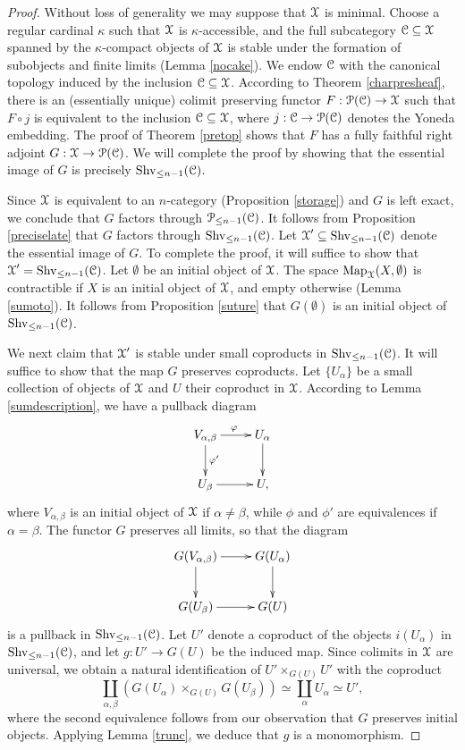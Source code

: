 \begin{proof}
Without loss of generality we may suppose that $\operatorname{\mathcal{X}}$ is minimal. Choose a regular cardinal $\kappa$ such that $\operatorname{\mathcal{X}}$ is $\kappa$-accessible, and the full subcategory $\operatorname{\mathcal{C}} \subseteq \operatorname{\mathcal{X}}$ spanned by the $\kappa$-compact objects of $\operatorname{\mathcal{X}}$ is stable under the formation of subobjects and finite limits (Lemma \ref{nocake}).
We endow $\operatorname{\mathcal{C}}$ with the canonical topology induced by the inclusion
$\operatorname{\mathcal{C}} \subseteq \operatorname{\mathcal{X}}$. According to Theorem \ref{charpresheaf}, there is an (essentially unique) colimit preserving functor $F: \operatorname{\mathcal{P}}(\operatorname{\mathcal{C}}) \rightarrow \operatorname{\mathcal{X}}$ such that $F \circ j$ is equivalent
to the inclusion $\operatorname{\mathcal{C}} \subseteq \operatorname{\mathcal{X}}$, where $j: \operatorname{\mathcal{C}} \rightarrow \operatorname{\mathcal{P}}(\operatorname{\mathcal{C}})$ denotes the Yoneda embedding. The proof of Theorem \ref{pretop} shows that $F$ has a fully faithful right adjoint $G: \operatorname{\mathcal{X}} \rightarrow \operatorname{\mathcal{P}}(\operatorname{\mathcal{C}})$. We will complete the proof by showing that the essential image of $G$ is precisely $\operatorname{Shv}_{\leq n-1}(\operatorname{\mathcal{C}})$. 

Since $\operatorname{\mathcal{X}}$ is equivalent to an $n$-category (Proposition \ref{storage}) and $G$ is left exact, we conclude that $G$ factors through $\operatorname{\mathcal{P}}_{\leq n-1}(\operatorname{\mathcal{C}})$. It follows from Proposition \ref{preciselate} that $G$ factors through $\operatorname{Shv}_{\leq n-1}(\operatorname{\mathcal{C}})$. Let $\operatorname{\mathcal{X}}' \subseteq \operatorname{Shv}_{\leq n-1}(\operatorname{\mathcal{C}})$ denote the essential image of $G$. To complete the proof, it will suffice to show that $\operatorname{\mathcal{X}}' = \operatorname{Shv}_{\leq n-1}(\operatorname{\mathcal{C}})$. Let $\emptyset$ be an initial object of $\operatorname{\mathcal{X}}$. The space $\operatorname{{Map}}_{\operatorname{\mathcal{X}}}(X, \emptyset)$ is contractible if $X$ is an initial object of $\operatorname{\mathcal{X}}$, and empty otherwise (Lemma \ref{sumoto}). It follows from Proposition \ref{suture} that $G(\emptyset)$ is an initial object of $\operatorname{Shv}_{\leq n-1}(\operatorname{\mathcal{C}})$. 

We next claim that $\operatorname{\mathcal{X}}'$ is stable under small coproducts in $\operatorname{Shv}_{\leq n-1}(\operatorname{\mathcal{C}})$. It will suffice to show that the map $G$ preserves coproducts. Let $\{ U_{\alpha} \}$ be a small collection of objects of $\operatorname{\mathcal{X}}$ and $U$ their coproduct in $\operatorname{\mathcal{X}}$. According to Lemma \ref{sumdescription}, we have a pullback diagram
$$ \xymatrix{ V_{\alpha,\beta} \ar[r]^{\phi} \ar[d]^{\phi'} & U_{\alpha} \ar[d] \\
U_{\beta} \ar[r] & U, }$$
where $V_{\alpha,\beta}$ is an initial object of $\operatorname{\mathcal{X}}$ if $\alpha \neq \beta$, while
$\phi$ and $\phi'$ are equivalences if $\alpha = \beta$.
The functor $G$ preserves all limits, so that the diagram
$$ \xymatrix{ G(V_{\alpha,\beta}) \ar[r] \ar[d] & G(U_{\alpha}) \ar[d] \\
G( U_{\beta} ) \ar[r] & G(U) }$$
is a pullback in $\operatorname{Shv}_{\leq n-1}(\operatorname{\mathcal{C}})$. Let $U'$ denote a coproduct
of the objects $i(U_{\alpha})$ in $\operatorname{Shv}_{\leq n-1}(\operatorname{\mathcal{C}})$, and let $g: U' \rightarrow G(U)$ be the induced map. Since colimits in $\operatorname{\mathcal{X}}$ are universal, we obtain a natural identification of
$U' \times_{G(U)} U'$ with the coproduct
$$ \coprod_{\alpha, \beta} ( G(U_{\alpha}) \times_{ G(U) } G(U_{\beta}) )
\simeq \coprod_{\alpha} U_{\alpha} \simeq U',$$
where the second equivalence follows from our observation that $G$ preserves initial objects.
Applying Lemma \ref{trunc}, we deduce that $g$ is a monomorphism.


\end{proof}
